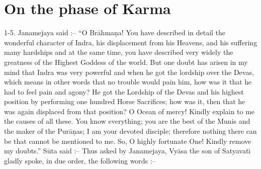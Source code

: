\chapter{On the phase of Karma}

1-5. Janamejaya said :-- ``O Br\=ahma\d{n}a! You have described in detail the wonderful character of Indra, his displacement from his Heavens, and his suffering many hardships and at the same time, you have described very widely the greatness of the Highest Goddess of the world. But one doubt has arisen in my mind that Indra was very powerful and when he got the lordship over the Devas, which means in other words that no trouble would pain him, how was it that he had to feel pain and agony? He got the Lordship of the Devas and his highest position by performing one hundred Horse Sacrifices; how was it, then that he was again displaced from that position? O Ocean of mercy! Kindly explain to me the causes of all these. You know everything; you are the best of the Munis and the maker of the Pur\=a\d{n}as; I am your devoted disciple; therefore nothing there can be that cannot be mentioned to me. So, O highly fortunate One! Kindly remove my doubts.'' S\=uta said :-- Thus asked by Janamejaya, Vy\=asa the son of Satyavat\={\i} gladly spoke, in due order, the following words :--

